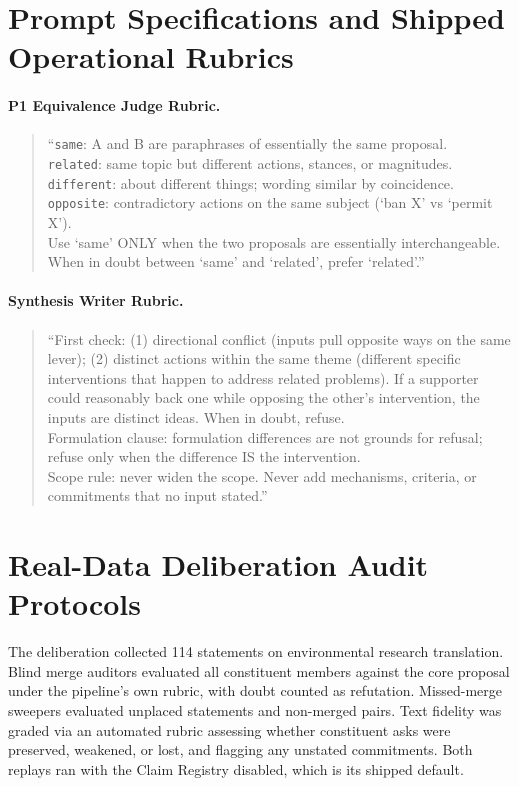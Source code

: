 \documentclass{article}
\begin{document}
\section{Prompt Specifications and Shipped Operational Rubrics}

\paragraph{P1 Equivalence Judge Rubric.}
\begin{quote}
\small
``\texttt{same}: A and B are paraphrases of essentially the same proposal.\\
\texttt{related}: same topic but different actions, stances, or magnitudes.\\
\texttt{different}: about different things; wording similar by coincidence.\\
\texttt{opposite}: contradictory actions on the same subject (`ban X' vs `permit X').\\
Use `same' ONLY when the two proposals are essentially interchangeable. When in doubt between `same' and `related', prefer `related'.''
\end{quote}

\paragraph{Synthesis Writer Rubric.}
\begin{quote}
\small
``First check: (1) directional conflict (inputs pull opposite ways on the same lever); (2) distinct actions within the same theme (different specific interventions that happen to address related problems). If a supporter could reasonably back one while opposing the other's intervention, the inputs are distinct ideas. When in doubt, refuse.\\
Formulation clause: formulation differences are not grounds for refusal; refuse only when the difference IS the intervention.\\
Scope rule: never widen the scope. Never add mechanisms, criteria, or commitments that no input stated.''
\end{quote}

\section{Real-Data Deliberation Audit Protocols}

The deliberation collected 114 statements on environmental research translation. Blind merge auditors evaluated all constituent members against the core proposal under the pipeline's own rubric, with doubt counted as refutation. Missed-merge sweepers evaluated unplaced statements and non-merged pairs. Text fidelity was graded via an automated rubric assessing whether constituent asks were preserved, weakened, or lost, and flagging any unstated commitments. Both replays ran with the Claim Registry disabled, which is its shipped default.
\end{document}
